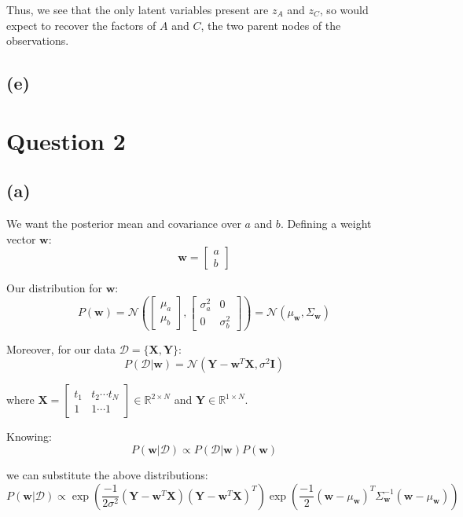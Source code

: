 \documentclass[12pt]{article}
\begin{document}
Thus, we see that the only latent variables present are $z_A$ and $z_C$, so would expect to recover the factors of $A$ and $C$, the two parent nodes of the observations.


\subsection*{(e)}


\newpage
\section*{Question 2}

\subsection*{(a)}

We want the posterior mean and covariance over $a$ and $b$.
Defining a weight vector $\textbf{w}$:
\[\textbf{w} = \begin{bmatrix}
                 a \\
                 b
         \end{bmatrix}\]

Our distribution for $\textbf{w}$:
\[P(\textbf{w}) = \mathcal{N} \left(
\begin{bmatrix}
                 \mu_a \\
                 \mu_b
         \end{bmatrix} ,
\begin{bmatrix}
                 \sigma_a^2 & 0 \\
                 0 & \sigma_b^2
         \end{bmatrix}
\right)
  = \mathcal{N}(\mu_{\textbf{w}}, \Sigma_{\textbf{w}})
\]

Moreover, for our data $\mathcal{D} = \{\textbf{X}, \textbf{Y}\}$:
\[P(\mathcal{D} | \textbf{w}) = \mathcal{N} \left( \textbf{Y} - \textbf{w}^T \textbf{X}, \sigma^2 \textbf{I}
\right)
\]

where $\textbf{X} =  \begin{bmatrix}
                 t_1 & t_2 \cdots t_N \\
                 1 & 1 \cdots 1
         \end{bmatrix} \in  \mathbb{R}^{2 \times N}$ and $\textbf{Y} \in \mathbb{R}^{1 \times N}$.

Knowing:
\[P(\textbf{w} | \mathcal{D}) \propto P(\mathcal{D} | \textbf{w}) P(\textbf{w})\]

we can substitute the above distributions:
\[P(\textbf{w} | \mathcal{D}) \propto
  \exp \left(\frac{-1}{2 \sigma^2} \left( \textbf{Y} - \textbf{w}^T \textbf{X}\right) \left( \textbf{Y} - \textbf{w}^T \textbf{X}\right)^T \right)
\exp \left(\frac{-1}{2} \left( \textbf{w} -\mu_{\textbf{w}}\right)^T \Sigma_{\textbf{w}}^{-1} \left( \textbf{w} -\mu_{\textbf{w}}\right)\right)
\]
\end{document}
